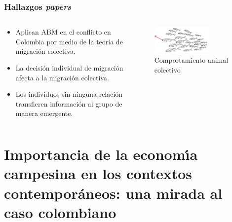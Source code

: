 \documentclass[17pt, t, lualatex]{beamer}
\begin{document}
\begin{frame}[allowframebreaks]
  \frametitle{Hallazgos \textit{papers}}
  
  \begin{columns}
    \begin{column}{.5\textwidth}
      \begin{itemize}
        \item Aplican ABM en el conflicto en Colombia por medio de la teoría de
              migración colectiva.
        \item La decisión individual de migración afecta a la migración colectiva.
        \item Los individuos sin ninguna relación transfieren información al
              grupo de manera emergente.
      \end{itemize}
    \end{column}

    \begin{column}{.5\textwidth}
      \begin{figure}[ht]
        \centering
        \includegraphics[width=0.7\textwidth]{img/Paper3Fig1.png}
        \caption{\label{fig:p1f1} Comportamiento animal colectivo\cite{Gutierrez2012}}
      \end{figure}

    \end{column}
  \end{columns}

\end{frame}

\section{Importancia de la economı́a campesina en los contextos contemporáneos: una mirada al caso colombiano}

\insertsectionpage
\end{document}
